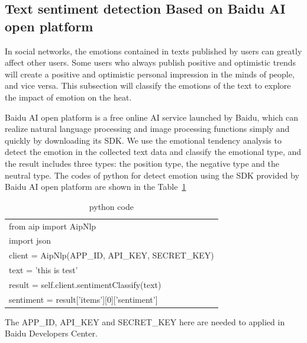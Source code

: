 \documentclass[10pt,twocolumn,letterpaper]{article}
\begin{document}
\subsection{Text sentiment detection Based on Baidu AI open platform}
    In social networks, the emotions contained in texts published by users can greatly affect other users.
    Some users who always publish positive and optimistic trends will create a positive and optimistic personal impression in the minds of people, and vice versa.
    This subsection will classify the emotions of the text to explore the impact of emotion on the heat.

    Baidu AI open platform is a free online AI service launched by Baidu, which can realize natural language processing and image processing functions simply and quickly by downloading its SDK.
    We use the emotional tendency analysis to detect the emotion in the collected text data and classify the emotional type, and the result includes three types: the position type, the negative type and the neutral type.
    The codes of python for detect emotion using the SDK provided by Baidu AI open platform are shown in the Table~\ref{emotioncode}
    \begin{table}
    \newcommand{\tabincell}[2]{\begin{tabular}{@{}#1@{}}#2\end{tabular}}
    \begin{center}
    \caption{python code}
    \vspace{0.5cm}
    \label{emotioncode}
    \begin{tabular}{l}
    \hline
    from aip import AipNlp\\
    import json\\
    client = AipNlp(APP\_ID, API\_KEY, SECRET\_KEY)\\
    text = 'this is test'\\
    result = self.client.sentimentClassify(text)\\
    sentiment = result['items'][0]['sentiment']\\
    \hline
    \end{tabular}
    \end{center}
    \end{table}
    \setlength{\tabcolsep}{1.4pt}
     The APP\_ID, API\_KEY and SECRET\_KEY here are needed to applied in Baidu Developers Center.
\end{document}
